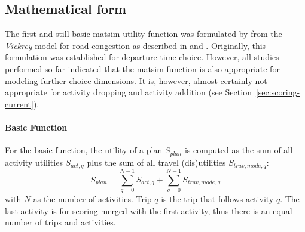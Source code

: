 \subsection{Mathematical form}

The first and still basic \gls{matsim} \gls{utility} function was formulated by \citet[][]{CharyparNagel2005ga4acts} from the \emph{Vickrey} model for road congestion as described in \citet[][]{Vickrey_TAER_1969} and \citet[][]{ArnottEtAl_TAER_1993}. Originally, this formulation was established for departure time choice. However, all studies performed so far indicated that the \gls{matsim} function is also appropriate for modeling 
further choice dimensions.
%
It is, however, almost certainly not appropriate for activity dropping and activity addition (see Section~\ref{sec:scoring-current}).




\paragraph{Basic Function}

For the basic function, the utility of a plan $S_{plan}$ is computed as the sum of all activity utilities $S_{act,q}$ plus the sum of all travel (dis)utilities $S_{trav,mode, q}$:
%
\begin{equation}
\label{eq:matsimUTF}
S_{plan}=\sum^{N-1}_{q=0} S_{act,q} + \sum^{N-1}_{q=0} S_{trav, mode, q}
\end{equation}
with $N$ as the number of activities. Trip $q$ is the trip that follows activity $q$. The last activity is for scoring merged with the first activity, thus there is an equal number of trips and activities.

